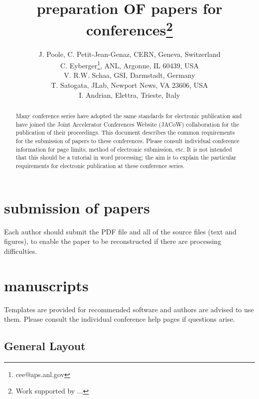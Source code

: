 \documentclass[acus,%
              ]{jacow}
\begin{document}
\title{preparation OF papers for  conferences\thanks{Work supported by ...}}

\author{J. Poole, C. Petit-Jean-Genaz, CERN, Geneva, Switzerland\\
        C. Eyberger\thanks{cee@aps.anl.gov}, ANL, Argonne, IL 60439, USA\\
        V. R.{\kern-2pt}W\kern-2pt. Schaa, GSI,  Darmstadt, Germany\\
        T. Satogata, JLab, Newport News, VA 23606, USA\\
        I. Andrian, Elettra, Trieste, Italy}

\maketitle

%
\begin{abstract}
   Many conference series have adopted the same standards for electronic
   publication and have joined the Joint Accelerator Conferences Website (JACoW)
   collaboration for the publication of their proceedings.
   This document describes the common requirements for the submission of papers
   to these conferences. Please consult individual conference
   information for page limits, method of electronic submission, etc.
   It is not intended that this should be a tutorial in word processing;
   the aim is to explain the particular requirements for electronic publication
   at these conference series.
\end{abstract}


\section{submission of papers}
Each author should submit the PDF file and all of the source files (text and figures),
to enable the paper to be reconstructed if there are processing difficulties.

\section{manuscripts}
Templates are provided for recommended software and authors are
advised to use them. Please consult the individual conference help pages if questions
arise.

\subsection{General Layout}
\end{document}
